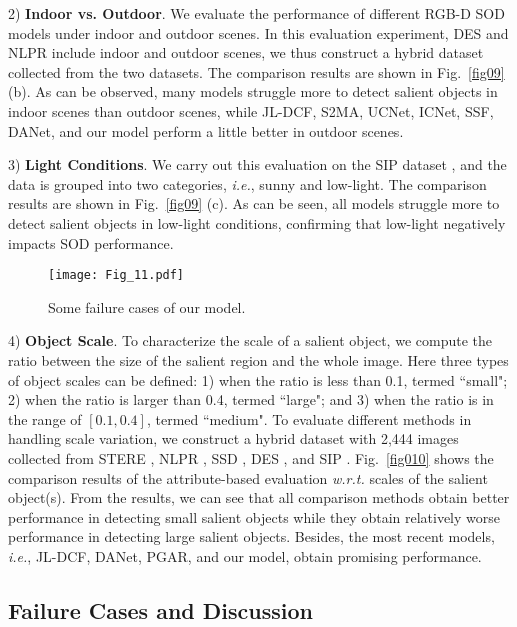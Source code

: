 \documentclass[10pt,twocolumn,letterpaper]{article}
\def\ie{\emph{i.e.}}
\begin{document}
2) \textbf{Indoor vs. Outdoor}. We evaluate the performance of different RGB-D SOD models under indoor and outdoor scenes. In this evaluation experiment, DES \cite{cheng2014depth} and NLPR \cite{peng2014rgbd} include indoor and outdoor scenes, we thus construct a hybrid dataset collected from the two datasets. The comparison results are shown in Fig.~\ref{fig09} (b). As can be observed, many models struggle more to detect salient objects in indoor scenes than outdoor scenes, while JL-DCF, S2MA, UCNet, ICNet, SSF, DANet, and our model perform a little better in outdoor scenes.

3) \textbf{Light Conditions}. We carry out this evaluation on the SIP dataset \cite{fan2019rethinking}, and the data is grouped into two categories, \ie, sunny and low-light. The comparison results are shown in Fig.~\ref{fig09} (c). As can be seen, all models struggle more to detect salient objects in low-light conditions, confirming that low-light negatively impacts SOD performance.


\begin{figure}[t!]
	\begin{centering} \texttt{[image: Fig\_11.pdf]}\caption{Some failure cases of our model.} \label{fig011}
	\end{centering}
\end{figure}

4) \textbf{Object Scale}. To characterize the scale of a salient object, we compute the ratio between the size of the salient region and the whole image. Here three types of object scales can be defined: 1) when the ratio is less than 0.1, termed ``small"; 2) when the ratio is larger than 0.4, termed ``large"; and 3) when the ratio is in the range of $[0.1, 0.4]$, termed ``medium". To evaluate different methods in handling scale variation, we construct a hybrid dataset with 2,444 images collected from STERE \cite{niu2012leveraging}, NLPR \cite{peng2014rgbd}, SSD \cite{zhu2017three}, DES \cite{cheng2014depth}, and SIP \cite{fan2019rethinking}. Fig.~\ref{fig010} shows the comparison results of the attribute-based evaluation \emph{w.r.t.} scales of the salient object(s). From the results, we can see that all comparison methods obtain better performance in detecting small salient objects while they obtain relatively worse performance in detecting large salient objects. Besides, the most recent models, \ie, JL-DCF, DANet, PGAR, and our model, obtain promising performance.




\subsection{Failure Cases and Discussion}
\end{document}
